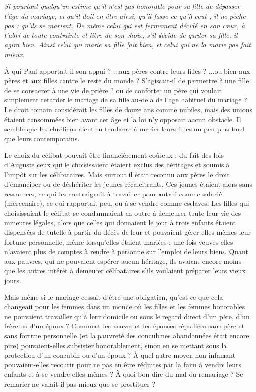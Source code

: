 \begin{displayquote}[I~Cor~7,~36-38]
\emph{Si pourtant quelqu'un estime qu'il n'est pas honorable pour sa fille de dépasser l'âge du mariage, et qu'il doit en être ainsi, qu'il fasse ce qu'il veut ; il ne pèche pas : qu'ils se marient. De même celui qui est fermement décidé en son cœur, à l'abri de toute contrainte et libre de son choix, s'il décide de garder sa fille, il agira bien. Ainsi celui qui marie sa fille fait bien, et celui qui ne la marie pas fait mieux}.
\end{displayquote}

À qui Paul apportait-il son appui ? ...aux pères contre leurs filles ? ...ou bien aux pères et aux filles contre le reste du monde ? S'agissait-il de permettre à une fille de se consacrer à une vie de prière ? ou de conforter un père qui voulait simplement retarder le mariage de sa fille au-delà de l'age habituel du mariage ? Le droit romain considérait les filles de douze ans comme nubiles, mais des unions étaient consommées bien avant cet âge et la loi n'y opposait aucun obstacle. Il semble que les chrétiens aient eu tendance à marier leurs filles un peu plus tard que leurs contemporains.
 
 Le choix du célibat pouvait être financièrement coûteux : du fait des lois d'Auguste ceux qui le choisissaient étaient exclus des héritages et soumis à l'impôt sur les célibataires. Mais surtout il était reconnu aux pères le droit d'émanciper ou de déshériter les jeunes récalcitrants. Ces jeunes étaient alors sans ressources, ce qui les contraignait à travailler pour autrui comme salarié (mercenaire), ce qui rapportait peu, ou à se vendre comme esclaves. Les filles qui choisissaient le célibat se condamnaient en outre à demeurer toute leur vie des mineures légales, alors que celles qui donnaient le jour à trois enfants étaient dispensées de tutelle à partir du décès de leur  et pouvaient gérer elles-mêmes leur fortune personnelle, même lorsqu'elles étaient mariées : une fois veuves elles n'avaient plus de comptes à rendre à personne sur l'emploi de leurs biens. Quant aux pauvres, qui ne pouvaient espérer aucun héritage, ils avaient encore moins que les autres intérêt à demeurer célibataires s'ils voulaient préparer leurs vieux jours. 

 Mais même si le mariage cessait d'être une obligation, qu'est-ce que cela changeait pour les femmes dans un monde où les filles et les femmes honorables ne pouvaient travailler qu'à leur domicile ou sous le regard direct d'un père, d'un frère ou d'un époux ? Comment les veuves et les épouses répudiées sans père et sans fortune personnelle (et la pauvreté des concubines abandonnées était encore pire) pouvaient-elles subsister honorablement, sinon en se mettant sous la protection d'un concubin ou d'un époux ? À quel autre moyen non infamant pouvaient-elles recourir pour ne pas en être réduites par la faim à vendre leurs enfants et à se vendre elles-mêmes ? À quoi bon dire du mal du remariage ? Se remarier ne valait-il pas mieux que se prostituer ?

